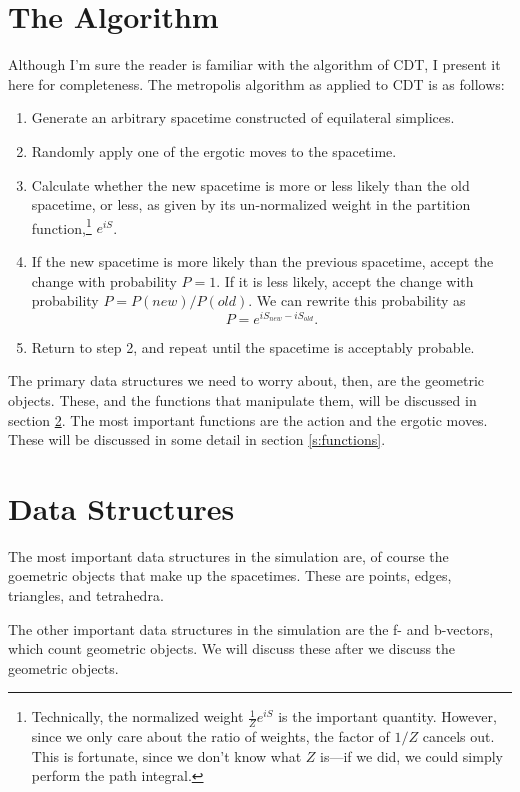 \documentclass[12pt]{article}
\begin{document}
\section{The Algorithm}
\label{s:algorithm}
Although I'm sure the reader is familiar with the algorithm of CDT, I
present it here for completeness. The metropolis algorithm as applied
to CDT is as follows:
\begin{enumerate}
\item Generate an arbitrary spacetime constructed of equilateral simplices.
\item Randomly apply one of the ergotic moves to the spacetime.
\item Calculate whether the new spacetime is more or less likely than
  the old spacetime, or less, as given by its un-normalized weight in
  the partition function,\footnote{Technically, the normalized weight
    $\frac{1}{Z}e^{iS}$ is the important quantity. However, since we
    only care about the ratio of weights, the factor of $1/Z$ cancels
    out. This is fortunate, since we don't know what $Z$ is---if we
    did, we could simply perform the path integral.} $e^{i S}$.
\item If the new spacetime is more likely than the previous spacetime,
  accept the change with probability $P=1$. If it is less likely,
  accept the change with probability $P = P(new)/P(old)$. We can
  rewrite this probability as
  $$P = e^{i S_{new} - i S_{old}}.$$
\item Return to step 2, and repeat until the spacetime is acceptably
  probable.
\end{enumerate}
The primary data structures we need to worry about, then, are the
geometric objects. These, and the functions that manipulate them, will
be discussed in section \ref{s:data-structures}. The most important
functions are the action and the ergotic moves. These will be
discussed in some detail in section \ref{s:functions}.

\section{Data Structures}
\label{s:data-structures}

The most important data structures in the simulation are, of course
the goemetric objects that make up the spacetimes. These are points,
edges, triangles, and tetrahedra. 

The other important data structures in the simulation are the f- and
b-vectors, which count geometric objects. We will discuss these after
we discuss the geometric objects.
\end{document}
